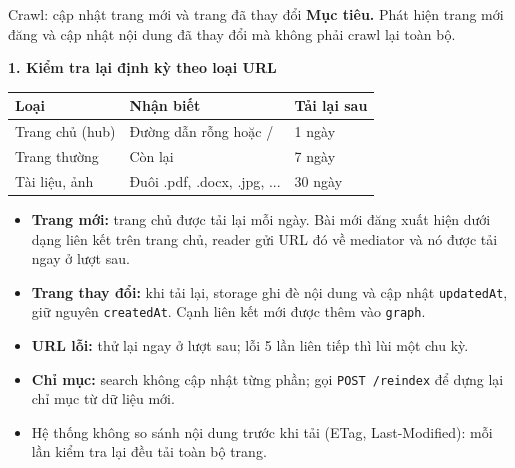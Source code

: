 \documentclass[aspectratio=169,t,10pt]{beamer}
\newcommand{\code}[1]{\texttt{#1}}
\newcommand{\ex}[1]{{\ttfamily\footnotesize #1}}
\newcommand{\muctieu}[1]{\noindent\textbf{Mục tiêu.} #1\par\vspace{4pt}}
\begin{document}
\begin{frame}[shrink]{Crawl: cập nhật trang mới và trang đã thay đổi}
\small
\muctieu{Phát hiện trang mới đăng và cập nhật nội dung đã thay đổi mà không phải crawl lại toàn bộ.}
\textbf{1. Kiểm tra lại định kỳ theo loại URL}\par\vspace{2pt}
\footnotesize
\renewcommand{\arraystretch}{1.25}
\begin{tabularx}{\textwidth}{@{}P{2.4cm}YP{3.0cm}@{}}
\toprule
\textbf{Loại} & \textbf{Nhận biết} & \textbf{Tải lại sau}\\
\midrule
Trang chủ (hub) & Đường dẫn rỗng hoặc \ex{/} & 1 ngày\\
Trang thường & Còn lại & 7 ngày\\
Tài liệu, ảnh & Đuôi \ex{.pdf}, \ex{.docx}, \ex{.jpg}, ... & 30 ngày\\
\bottomrule
\end{tabularx}
\small
\vspace{4pt}
\begin{itemize}
  \item \textbf{Trang mới:} trang chủ được tải lại mỗi ngày. Bài mới đăng xuất hiện dưới dạng liên kết trên trang chủ, reader gửi URL đó về mediator và nó được tải ngay ở lượt sau.
  \item \textbf{Trang thay đổi:} khi tải lại, storage ghi đè nội dung và cập nhật \code{updatedAt}, giữ nguyên \code{createdAt}. Cạnh liên kết mới được thêm vào \code{graph}.
  \item \textbf{URL lỗi:} thử lại ngay ở lượt sau; lỗi 5 lần liên tiếp thì lùi một chu kỳ.
  \item \textbf{Chỉ mục:} search không cập nhật từng phần; gọi \code{POST /reindex} để dựng lại chỉ mục từ dữ liệu mới.
  \item Hệ thống không so sánh nội dung trước khi tải (ETag, Last-Modified): mỗi lần kiểm tra lại đều tải toàn bộ trang.
\end{itemize}
\end{frame}
\end{document}
